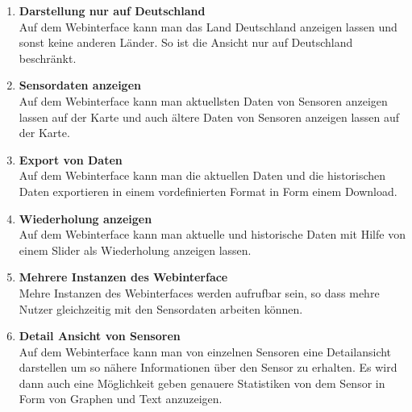 \begin{enumerate}[label=\textbf{PF\arabic{enumi}0}]
	 \item \textbf{Darstellung nur auf Deutschland}\\
	 	Auf dem Webinterface kann man das Land Deutschland anzeigen lassen und sonst keine anderen Länder. So ist die Ansicht nur auf Deutschland beschränkt.
	 
	 \item \textbf{Sensordaten anzeigen}\\
		Auf dem Webinterface kann man aktuellsten Daten von Sensoren anzeigen lassen auf der Karte und auch ältere Daten von Sensoren anzeigen lassen auf der Karte.
		
	\item \textbf{Export von Daten}\\
		Auf dem Webinterface kann man die aktuellen Daten und die historischen Daten exportieren in einem vordefinierten Format in Form einem Download. 
		
	\item \textbf{Wiederholung anzeigen}\\
		Auf dem Webinterface kann man aktuelle und historische Daten mit Hilfe von einem Slider als Wiederholung anzeigen lassen.
		
	\item \textbf{Mehrere Instanzen des Webinterface}\\
		Mehre Instanzen des Webinterfaces werden aufrufbar sein, so dass mehre Nutzer gleichzeitig mit den Sensordaten arbeiten können.
		
	\item \textbf{Detail Ansicht von Sensoren}\\
		Auf dem Webinterface kann man von einzelnen Sensoren eine Detailansicht darstellen um so nähere Informationen über den Sensor zu erhalten. Es wird dann auch eine Möglichkeit geben genauere Statistiken von dem Sensor in Form von Graphen und Text anzuzeigen.
\end{enumerate}

